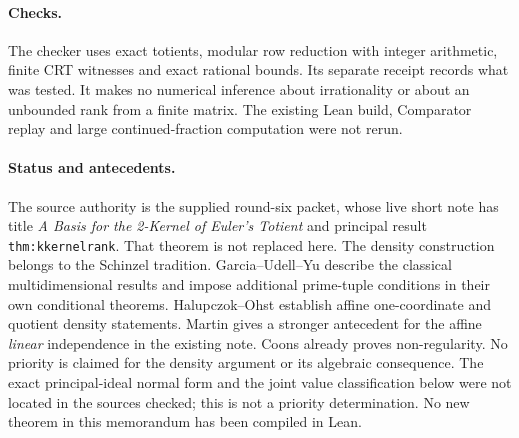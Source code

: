 \documentclass[11pt,a4paper]{article}
\theoremstyle{definition}\newtheorem{definition}[theorem]{Definition}
\theoremstyle{remark}\newtheorem{remark}[theorem]{Remark}
\begin{document}
\paragraph{Checks.}
The checker uses exact totients, modular row reduction with integer arithmetic,
finite CRT witnesses and exact rational bounds. Its separate receipt records
what was tested. It makes no numerical inference about irrationality or about
an unbounded rank from a finite matrix. The existing Lean build, Comparator
replay and large continued-fraction computation were not rerun.

\paragraph{Status and antecedents.}
The source authority is the supplied round-six packet, whose live short note has
title \emph{A Basis for the 2-Kernel of Euler's Totient} and principal result
\texttt{thm:kkernelrank}. That theorem is not replaced here.
The density construction belongs to the Schinzel tradition. Garcia--Udell--Yu
\cite{guy} describe the classical multidimensional results and impose additional
prime-tuple conditions in their own conditional theorems. Halupczok--Ohst
\cite{ho} establish affine one-coordinate and quotient density statements.
Martin \cite{martin} gives a stronger antecedent for the affine \emph{linear}
independence in the existing note. Coons \cite{coons} already proves non-regularity.
No priority is claimed for the density argument or its algebraic consequence.
The exact principal-ideal normal form and the joint value classification below
were not located in the sources checked; this is not a priority determination.
No new theorem in this memorandum has been compiled in Lean.
\end{document}
